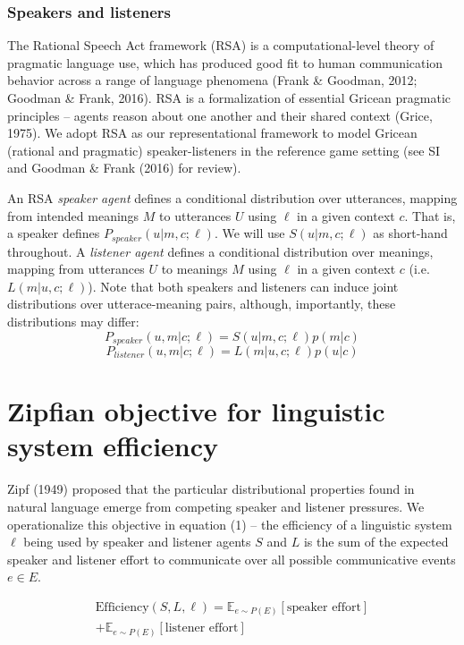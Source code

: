 \documentclass[10pt, letterpaper]{article}
\begin{document}
\subsubsection{Speakers and listeners}\label{speakers-and-listeners}

The Rational Speech Act framework (RSA) is a computational-level theory
of pragmatic language use, which has produced good fit to human
communication behavior across a range of language phenomena (Frank \&
Goodman, 2012; Goodman \& Frank, 2016). RSA is a formalization of
essential Gricean pragmatic principles -- agents reason about one
another and their shared context (Grice, 1975). We adopt RSA as our
representational framework to model Gricean (rational and pragmatic)
speaker-listeners in the reference game setting (see SI and Goodman \&
Frank (2016) for review).\par

An RSA \emph{speaker agent} defines a conditional distribution over
utterances, mapping from intended meanings \(M\) to utterances \(U\)
using \(\ell\) in a given context \(c\). That is, a speaker defines
\(P_{speaker}(u|m, c; \ell)\). We will use \(S(u|m, c; \ell)\) as
short-hand throughout. A \emph{listener agent} defines a conditional
distribution over meanings, mapping from utterances \(U\) to meanings
\(M\) using \(\ell\) in a given context \(c\) (i.e. \(L(m|u, c;\ell)\)).
Note that both speakers and listeners can induce joint distributions
over utterace-meaning pairs, although, importantly, these distributions
may differ: \[P_{speaker}(u, m | c; \ell) = S(u|m, c; \ell)p(m|c)\]
\[P_{listener}(u, m| c; \ell) = L(m|u, c; \ell)p(u|c)\]

\section{Zipfian objective for linguistic system
efficiency}\label{zipfian-objective-for-linguistic-system-efficiency}

Zipf (1949) proposed that the particular distributional properties found
in natural language emerge from competing speaker and listener
pressures. We operationalize this objective in equation (1) -- the
efficiency of a linguistic system \(\ell\) being used by speaker and
listener agents \(S\) and \(L\) is the sum of the expected speaker and
listener effort to communicate over all possible communicative events
\(e \in E\).\par

\begin{equation}
\begin{split}
  \text{Efficiency}(S, L, \ell) = \mathbb{E}_{e \sim P(E)}[\text{speaker effort}] \\+ \mathbb{E}_{e \sim P(E)}[\text{listener effort}]
\end{split}
\end{equation}
\end{document}
